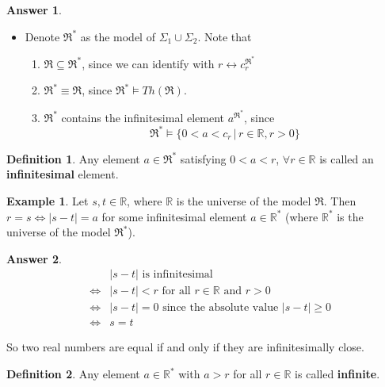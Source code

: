 \documentclass[11pt,letterpaper]{book}
\theoremstyle{definition}
\newtheorem{definition}{Definition}[section]
\newtheorem{example}{Example}[section]
\newtheorem{answer}{Answer}[section]
\begin{document}
\begin{answer}
\begin{itemize}
\begin{proof}
\end{proof}
\item{Denote $\mathfrak{R}^*$ as the model of $\Sigma_1
\cup \Sigma_2$. Note that
\begin{enumerate}
\item{$\mathfrak{R} \subseteq \mathfrak{R}^*$, since we can identify
with $r \longleftrightarrow  c_r ^{\mathfrak{R}^*} $}
\item{$\mathfrak{R}^* \equiv \mathfrak{R}$, since $\mathfrak{R}^*
\models Th(\mathfrak{R})$.}
\item{$\mathfrak{R}^*$ contains the infinitesimal element
$a^{\mathfrak{R}^*}$, since
$$ \mathfrak{R}^* \models \{ 0 < a < c_r \, | \, r \in \mathbb{R}, r >
0  \} $$
}
\end{enumerate}

}

\end{itemize}

\end{answer}

\begin{definition}
Any element $a \in \mathfrak{R}^*$ satisfying $0 < a < r$, $\forall r
\in \mathbb{R}$ is called an \textbf{infinitesimal} element.
\end{definition}


\begin{example}
Let $s, t \in \mathbb{R}$, where $\mathbb{R}$ is the universe of the
model $\mathfrak{R}$. Then $r = s \iff |s - t| = a$ for some
infinitesimal element $a \in \mathbb{R}^*$ (where $\mathbb{R}^*$ is the
universe of the model $\mathfrak{R}^*$).
\end{example}

\begin{answer}
\begin{eqnarray*}
& & |s - t| \text{ is infinitesimal } \\
& \iff & | s - t | < r \text{ for all } r \in \mathbb{R} \text{ and }  r
   > 0 \\
& \iff & | s - t | = 0 \text{ since the absolute value } | s - t | \geq 0 \\
& \iff & s = t
\end{eqnarray*}

So two real numbers are equal if and only if they are infinitesimally close.

\end{answer}

\begin{definition}
Any element $a \in \mathbb{R}^* $ with $a > r$ for all $r \in
\mathbb{R}$ is called \textbf{infinite}.
\end{definition}
\end{document}
